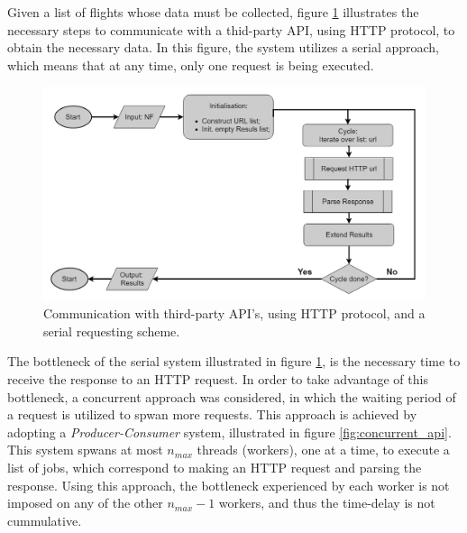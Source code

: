 
Given a list of flights whose data must be collected, figure \ref{fig:serial_api} illustrates the necessary steps to communicate  with a thid-party API, using HTTP protocol, to obtain the necessary data. In this figure, the system utilizes a serial approach, which means that at any time, only one request is being executed. 

\begin{figure}[htpb]
  \centering
  \includegraphics[width=\textwidth]{./Figures/system_implementation/serial_api.png}
  \caption{Communication with third-party API's, using HTTP protocol, and a serial requesting scheme.}
  \label{fig:serial_api}  
\end{figure}

The bottleneck of the serial system illustrated in figure \ref{fig:serial_api}, is the necessary time to receive the response to an HTTP request. In order to take advantage of this bottleneck, a concurrent approach was considered, in which the waiting period of a request is utilized to spwan more requests. This approach is achieved by adopting a \textit{Producer-Consumer} system, illustrated in figure \ref{fig:concurrent_api}. This system spwans at most $n_{max}$ threads (workers), one at a time, to execute a list of jobs, which correspond to making an HTTP request and parsing the response. Using this approach, the bottleneck experienced by each worker is not imposed on any of the other $n_{max} -1$ workers, and thus the time-delay is not cummulative.



